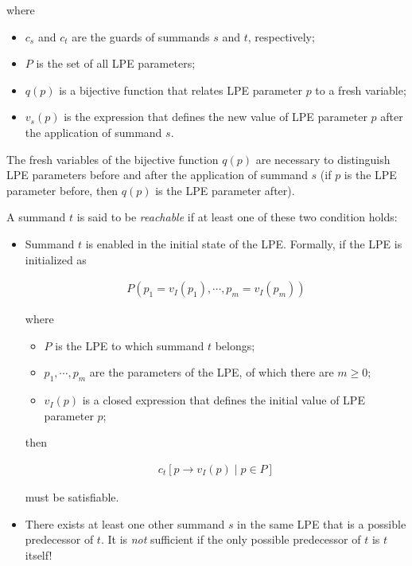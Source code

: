 where

\begin{itemize}
\item $c_s$ and $c_t$ are the guards of summands $s$ and $t$, respectively;
\item $P$ is the set of all LPE parameters;
\item $q(p)$ is a bijective function that relates LPE parameter $p$ to a fresh variable;
\item $v_s(p)$ is the expression that defines the new value of LPE parameter $p$ after the application of summand $s$.
\end{itemize}

The fresh variables of the bijective function $q(p)$ are necessary to distinguish LPE parameters before and after the application of summand $s$ (if $p$ is the LPE parameter before, then $q(p)$ is the LPE parameter after).

A summand $t$ is said to be \emph{reachable} if at least one of these two condition holds:

\begin{itemize}
\item Summand $t$ is enabled in the initial state of the LPE.
Formally, if the LPE is initialized as

\begin{align*}
P(p_1 = v_I(p_1), \cdots{}, p_m = v_I(p_m))
\end{align*}

where

\begin{itemize}
\item $P$ is the LPE to which summand $t$ belongs;
\item $p_1, \cdots{}, p_m$ are the parameters of the LPE, of which there are $m \geq 0$;
\item $v_I(p)$ is a closed expression that defines the initial value of LPE parameter $p$;
\end{itemize}

then

\begin{align*}
c_t[p \rightarrow v_I(p) \;|\; p \in P]
\end{align*}

must be satisfiable.

\item There exists at least one other summand $s$ in the same LPE that is a possible predecessor of $t$.
It is \emph{not} sufficient if the only possible predecessor of $t$ is $t$ itself!
\end{itemize}

